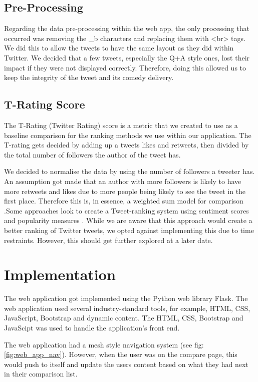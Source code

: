 	\subsection{Pre-Processing}
		Regarding the data pre-processing within the web app, the only processing that occurred was removing the \_b characters and replacing them with <br> tags. We did this to allow the tweets to have the same layout as they did within Twitter. We decided that a few tweets, especially the Q+A style ones, lost their impact if they were not displayed correctly. Therefore, doing this allowed us to keep the integrity of the tweet and its comedy delivery.
	
	\subsection{T-Rating Score}
		The T-Rating (Twitter Rating) score is a metric that we created to use as a baseline comparison for the ranking methods we use within our application. The T-rating gets decided by adding up a tweets likes and retweets, then divided by the total number of followers the author of the tweet has. 
		
		We decided to normalise the data by using the number of followers a tweeter has. An assumption got made that an author with more followers is likely to have more retweets and likes due to more people being likely to see the tweet in the first place. Therefore this is, in essence, a weighted sum model for comparison \cite{churchman1954approximate}.Some approaches look to create a Tweet-ranking system using sentiment scores and popularity measures \cite{aleidi2019tweet}. While we are aware that this approach would create a better ranking of Twitter tweets, we opted against implementing this due to time restraints. However, this should get further explored at a later date.
	
	\section{Implementation}
	
	The web application got implemented using the Python web library Flask. The web application used several industry-standard tools, for example, HTML, CSS, JavaScript, Bootstrap and dynamic content. The HTML, CSS, Bootstrap and JavaScipt was used to handle the application's front end. 
	
	The web application had a mesh style navigation system (see fig: \ref{fig:web_app_nav}). However, when the user was on the compare page, this would push to itself and update the users content based on what they had next in their comparison list.
	
